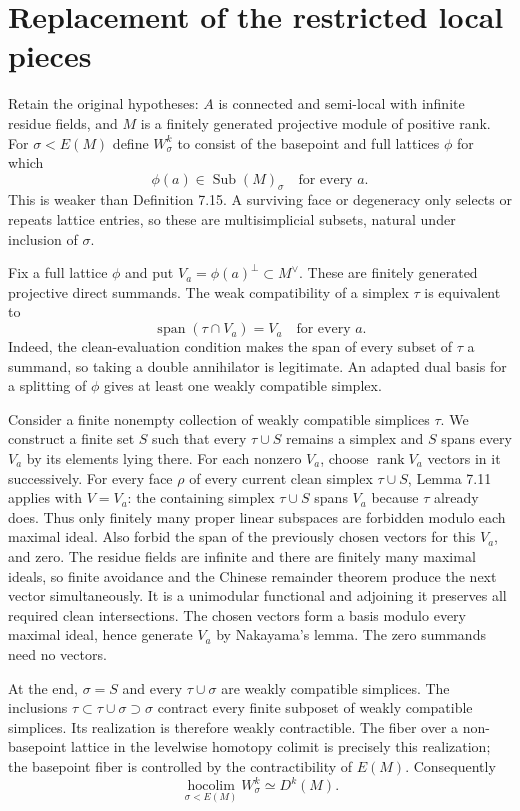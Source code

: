 \documentclass[10pt]{article}
\begin{document}
\section*{Replacement of the restricted local pieces}
Retain the original hypotheses: \(A\) is connected and semi-local with infinite residue fields, and \(M\) is a finitely generated projective module of positive rank. For \(\sigma<E(M)\) define \(W^k_\sigma\) to consist of the basepoint and full lattices \(\phi\) for which \[\phi(a)\in\operatorname{Sub}(M)_\sigma\quad\text{for every }a.\] This is weaker than Definition 7.15. A surviving face or degeneracy only selects or repeats lattice entries, so these are multisimplicial subsets, natural under inclusion of \(\sigma\).\par
Fix a full lattice \(\phi\) and put \(V_a=\phi(a)^\perp\subset M^\vee\). These are finitely generated projective direct summands. The weak compatibility of a simplex \(\tau\) is equivalent to \[\operatorname{span}(\tau\cap V_a)=V_a\quad\text{for every }a.\] Indeed, the clean-evaluation condition makes the span of every subset of \(\tau\) a summand, so taking a double annihilator is legitimate. An adapted dual basis for a splitting of \(\phi\) gives at least one weakly compatible simplex.\par
Consider a finite nonempty collection of weakly compatible simplices \(\tau\). We construct a finite set \(S\) such that every \(\tau\cup S\) remains a simplex and \(S\) spans every \(V_a\) by its elements lying there. For each nonzero \(V_a\), choose \(\operatorname{rank}V_a\) vectors in it successively. For every face \(\rho\) of every current clean simplex \(\tau\cup S\), Lemma 7.11 applies with \(V=V_a\): the containing simplex \(\tau\cup S\) spans \(V_a\) because \(\tau\) already does. Thus only finitely many proper linear subspaces are forbidden modulo each maximal ideal. Also forbid the span of the previously chosen vectors for this \(V_a\), and zero. The residue fields are infinite and there are finitely many maximal ideals, so finite avoidance and the Chinese remainder theorem produce the next vector simultaneously. It is a unimodular functional and adjoining it preserves all required clean intersections. The chosen vectors form a basis modulo every maximal ideal, hence generate \(V_a\) by Nakayama’s lemma. The zero summands need no vectors.\par
At the end, \(\sigma=S\) and every \(\tau\cup\sigma\) are weakly compatible simplices. The inclusions \(\tau\subset\tau\cup\sigma\supset\sigma\) contract every finite subposet of weakly compatible simplices. Its realization is therefore weakly contractible. The fiber over a non-basepoint lattice in the levelwise homotopy colimit is precisely this realization; the basepoint fiber is controlled by the contractibility of \(E(M)\). Consequently \[\operatorname*{hocolim}_{\sigma<E(M)}W^k_\sigma
                      \simeq D^k(M).\]\par
\end{document}
